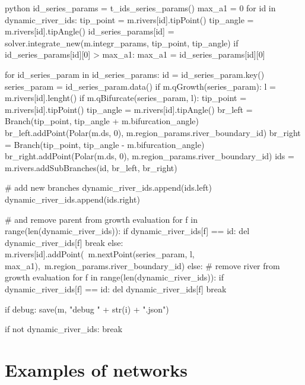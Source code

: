 \documentclass[]{pracamgr}
\begin{document}
\begin{mintedbox}{python}
          id_series_params = t_ids_series_params()
          max_a1 = 0
          for id in dynamic_river_ids:
              tip_point = m.rivers[id].tipPoint()
              tip_angle = m.rivers[id].tipAngle()
              id_series_params[id] = solver.integrate_new(m.integr_params, tip_point, tip_angle)
              if id_series_params[id][0] > max_a1:
                  max_a1 = id_series_params[id][0]

          for id_series_param in id_series_params:
              id = id_series_param.key()
              series_param = id_series_param.data()
              if m.qGrowth(series_param):
                  l = m.rivers[id].lenght()
                  if m.qBifurcate(series_param, l):
                      tip_point = m.rivers[id].tipPoint()
                      tip_angle = m.rivers[id].tipAngle()
                      br_left = Branch(tip_point, tip_angle + m.bifurcation_angle)
                      br_left.addPoint(Polar(m.ds, 0), m.region_params.river_boundary_id)
                      br_right = Branch(tip_point, tip_angle - m.bifurcation_angle)
                      br_right.addPoint(Polar(m.ds, 0), m.region_params.river_boundary_id)
                      ids = m.rivers.addSubBranches(id, br_left, br_right)

                      # add new branches
                      dynamic_river_ids.append(ids.left)
                      dynamic_river_ids.append(ids.right)

                      # and remove parent from growth evaluation
                      for f in range(len(dynamic_river_ids)):
                          if dynamic_river_ids[f] == id:
                              del dynamic_river_ids[f]
                              break
                  else: 
                      m.rivers[id].addPoint(\
                          m.nextPoint(series_param, l, max_a1),\
                          m.region_params.river_boundary_id)
              else:
                  # remove river from growth evaluation
                  for f in range(len(dynamic_river_ids)):
                      if dynamic_river_ids[f] == id:
                          del dynamic_river_ids[f]
                          break

          if debug:
              save(m, "debug " + str(i) + ".json")

          if not dynamic_river_ids:
              break
      \end{mintedbox}

      \section{Examples of networks}
        
\end{document}
